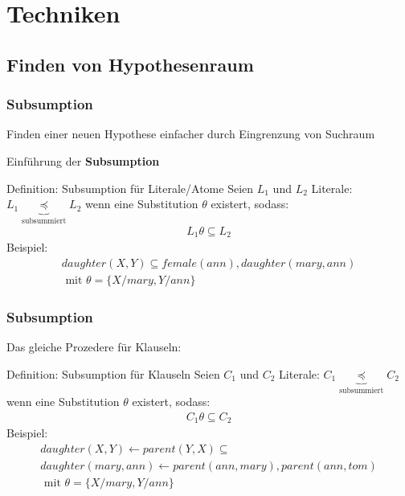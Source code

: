 \section{Techniken}

\subsection{Finden von Hypothesenraum}
\begin{frame}
	\frametitle{Subsumption}
	Finden einer neuen Hypothese einfacher durch Eingrenzung von Suchraum

	Einführung der \textbf{Subsumption}
	\begin{block}{Definition: Subsumption für Literale/Atome}
		Seien $L_1$ und $L_2$ Literale: $L_1 \underbrace{\preceq}_{\text{subsummiert}} L_2$
		wenn eine Substitution $\theta$ existert, sodass:
		\begin{align*}
			 L_1 \theta \subseteq L_2
		\end{align*}
		Beispiel:
		\begin{align*}
			 daughter(X, Y)  \subseteq female(ann), daughter(mary, ann)\\\text{  mit  } \theta = \{X/mary, Y/ann\}
		\end{align*}
	\end{block}
\end{frame}
\begin{frame}
	\frametitle{Subsumption}
	Das gleiche Prozedere für Klauseln:
	\begin{block}{Definition: Subsumption für Klauseln}
		Seien $C_1$ und $C_2$ Literale: $C_1 \underbrace{\preceq}_{\text{subsummiert}} C_2$
		wenn eine Substitution $\theta$ existert, sodass:
		\begin{align*}
			 C_1 \theta \subseteq C_2
		\end{align*}
		Beispiel:
		\begin{gather*}
			 daughter(X, Y) \leftarrow parent(Y,X) \subseteq\\
			 daughter(mary, ann) \leftarrow parent(ann, mary), parent(ann, tom)\\
			 \text{  mit  } \theta = \{X/mary, Y/ann\}
		\end{gather*}
	\end{block}
\end{frame}

